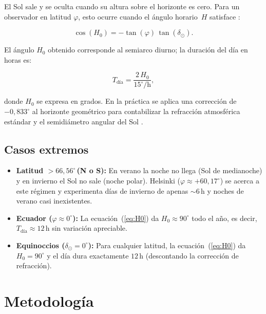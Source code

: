 El Sol sale y se oculta cuando su altura sobre el horizonte es cero.
Para un observador en latitud $\varphi$, esto ocurre cuando el ángulo horario~$H$
satisface \citep{Meeus1998}:

\begin{equation}
  \cos(H_0) = -\tan(\varphi)\,\tan(\delta_\odot).
  \label{eq:H0}
\end{equation}

El ángulo $H_0$ obtenido corresponde al semiarco diurno; la duración del día en horas
es:

\begin{equation}
  T_{\text{día}} = \frac{2\,H_0}{15^\circ/\text{h}},
  \label{eq:Tdia}
\end{equation}

donde $H_0$ se expresa en grados.
En la práctica se aplica una corrección de $-0{,}833^\circ$ al horizonte geométrico para
contabilizar la refracción atmosférica estándar y el semidiámetro angular del Sol
\citep{Meeus1998}.

\subsection{Casos extremos}

\begin{itemize}
  \item \textbf{Latitud $> 66{,}56^\circ$\,(N o S):}  En verano la noche no llega
        (Sol de medianoche) y en invierno el Sol no sale (noche polar). Helsinki
        ($\varphi \approx +60{,}17^\circ$) se acerca a este régimen y experimenta
        días de invierno de apenas ${\sim}6$\,h y noches de verano casi inexistentes.
  \item \textbf{Ecuador ($\varphi \approx 0^\circ$):} La ecuación~(\ref{eq:H0}) da
        $H_0 \approx 90^\circ$ todo el año, es decir, $T_{\text{día}} \approx 12$\,h
        sin variación apreciable.
  \item \textbf{Equinoccios ($\delta_\odot = 0^\circ$):} Para cualquier latitud,
        la ecuación~(\ref{eq:H0}) da $H_0 = 90^\circ$ y el día dura exactamente $12$\,h
        (descontando la corrección de refracción).
\end{itemize}

\section{Metodología}


